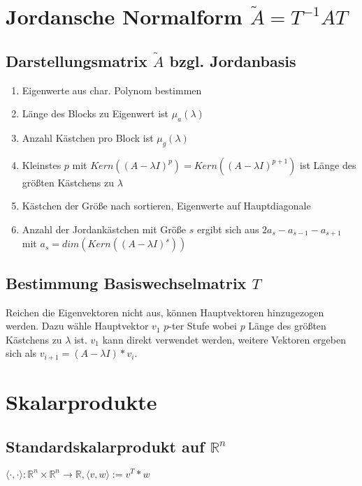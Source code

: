 \section*{Jordansche Normalform $\tilde A = T^{-1} A T$}

\subsection*{Darstellungsmatrix $\tilde A$ bzgl. Jordanbasis}

\begin{enumerate}[leftmargin=4mm]
	\item Eigenwerte aus char. Polynom bestimmen
	\item Länge des Blocks zu Eigenwert ist $\mu_a(\lambda)$
	\item Anzahl Kästchen pro Block ist $\mu_g(\lambda)$
	\item Kleinstes $p$ mit $Kern((A-\lambda I)^p) = Kern((A-\lambda I)^{p+1})$ ist Länge des größten Kästchens zu $\lambda$
	\item Kästchen der Größe nach sortieren, Eigenwerte auf Hauptdiagonale
	\item Anzahl der Jordankästchen mit Größe $s$ ergibt sich aus $2a_s - a_{s-1} - a_{s+1}$ mit $a_s = dim(Kern((A-\lambda I)^s))$
\end{enumerate}

\subsection*{Bestimmung Basiswechselmatrix $T$}

Reichen die Eigenvektoren nicht aus, können Hauptvektoren hinzugezogen werden. Dazu wähle Hauptvektor $v_1$ $p$-ter Stufe wobei $p$ Länge des größten Kästchens zu $\lambda$ ist. $v_1$ kann direkt verwendet werden, weitere Vektoren ergeben sich als $v_{i+1} = (A-\lambda I)*v_i$.

\section*{Skalarprodukte}

\subsection*{Standardskalarprodukt auf $\mathbb{R}^n$}

$\langle \cdot, \cdot \rangle : \mathbb{R}^n \times \mathbb{R}^n \rightarrow \mathbb{R}, \langle v, w \rangle := v^T * w$

